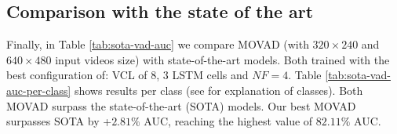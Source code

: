 \subsection{Comparison with the state of the art}
Finally, in Table \ref{tab:sota-vad-auc} we compare MOVAD (with $320\times240$ and $640\times480$ input videos size) with state-of-the-art models.
Both trained with the best configuration of: VCL of 8, 3 LSTM cells and $\mathit{NF}=4$.
Table \ref{tab:sota-vad-auc-per-class} shows results per class (see \cite{9712446} for explanation of classes).
Both MOVAD surpass the state-of-the-art (SOTA) models.
Our best MOVAD surpasses SOTA by +$2.81\%$ AUC, reaching the highest value of $82.11\%$ AUC.
